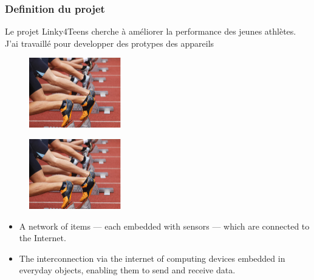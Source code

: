\documentclass[12pt]{beamer}
\let\olditem\item
\renewcommand\item{\olditem\justifying}
\begin{document}
\begin{frame}
\frametitle{Definition du projet}
Le projet Linky4Teens cherche à améliorer la performance des jeunes athlètes. J'ai travaillé pour developper des protypes des appareils 
	\begin{figure}
		\centering
		\includegraphics[width=0.36\textwidth]{"images/starting_bloc"}
		\label{fig:starting_bloc}
	\end{figure}
	\begin{figure}
		\centering
		\includegraphics[width=0.36\textwidth]{"images/starting_bloc"}
		\label{fig:starting_bloc}
	\end{figure}

\begin{itemize}
	\item A network of items — each embedded with sensors — which are connected to the Internet. 

	\item The interconnection via the internet of computing devices embedded in everyday objects, enabling them to send and receive data. 
\end{itemize}

\begin{figure}
	\centering
	\label{fig:iotdefinitionsbannerv2}
\end{figure}
\end{frame}
\end{document}

